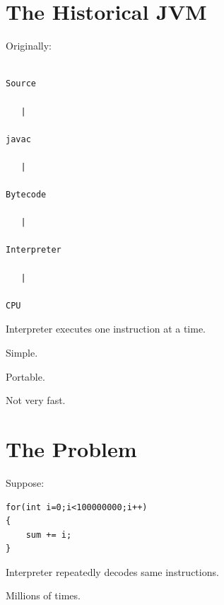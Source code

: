 \documentclass[11pt,a4paper]{book}
\begin{document}
\section{The Historical JVM}

Originally:

\begin{verbatim}

Source

   |

javac

   |

Bytecode

   |

Interpreter

   |

CPU

\end{verbatim}


Interpreter executes one instruction
at a time.


Simple.


Portable.


Not very fast.


\section{The Problem}

Suppose:

\begin{verbatim} 
for(int i=0;i<100000000;i++)
{
    sum += i;
}
\end{verbatim}


Interpreter repeatedly decodes
same instructions.


Millions of times.

\end{document}
